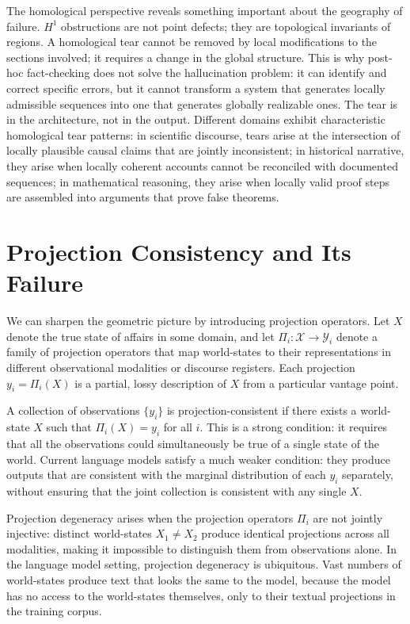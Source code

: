 \documentclass[11pt, oneside]{article}
\begin{document}
The homological perspective reveals something important about the geography of failure. $H^1$ obstructions are not point defects; they are topological invariants of regions. A homological tear cannot be removed by local modifications to the sections involved; it requires a change in the global structure. This is why post-hoc fact-checking does not solve the hallucination problem: it can identify and correct specific errors, but it cannot transform a system that generates locally admissible sequences into one that generates globally realizable ones. The tear is in the architecture, not in the output. Different domains exhibit characteristic homological tear patterns: in scientific discourse, tears arise at the intersection of locally plausible causal claims that are jointly inconsistent; in historical narrative, they arise when locally coherent accounts cannot be reconciled with documented sequences; in mathematical reasoning, they arise when locally valid proof steps are assembled into arguments that prove false theorems.

\section{Projection Consistency and Its Failure}

We can sharpen the geometric picture by introducing projection operators. Let $X$ denote the true state of affairs in some domain, and let $\Pi_i : \mathcal{X} \to \mathcal{Y}_i$ denote a family of projection operators that map world-states to their representations in different observational modalities or discourse registers. Each projection $y_i = \Pi_i(X)$ is a partial, lossy description of $X$ from a particular vantage point.

A collection of observations $\{y_i\}$ is projection-consistent if there exists a world-state $X$ such that $\Pi_i(X) = y_i$ for all $i$. This is a strong condition: it requires that all the observations could simultaneously be true of a single state of the world. Current language models satisfy a much weaker condition: they produce outputs that are consistent with the marginal distribution of each $y_i$ separately, without ensuring that the joint collection is consistent with any single $X$.

Projection degeneracy arises when the projection operators $\Pi_i$ are not jointly injective: distinct world-states $X_1 \neq X_2$ produce identical projections across all modalities, making it impossible to distinguish them from observations alone. In the language model setting, projection degeneracy is ubiquitous. Vast numbers of world-states produce text that looks the same to the model, because the model has no access to the world-states themselves, only to their textual projections in the training corpus.
\end{document}
